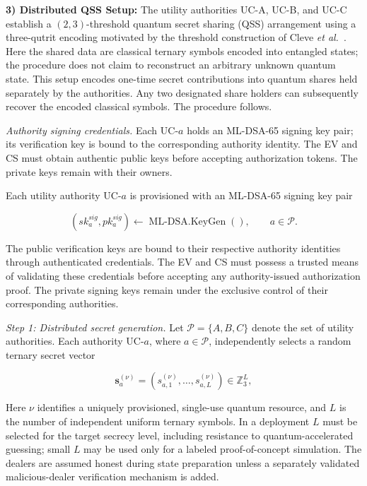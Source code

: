 \documentclass[twocolumn,10pt,journal]{IEEEtran}
\begin{document}
\noindent\textbf{3) Distributed QSS Setup:}
The utility authorities UC-A, UC-B, and UC-C establish
a $(2,3)$-threshold quantum secret sharing (QSS)
arrangement using a three-qutrit encoding motivated by the
threshold construction of Cleve \emph{et al.}~\cite{cleve1999quantum}.
Here the shared data are classical ternary symbols encoded into
entangled states; the procedure does not claim to reconstruct an
arbitrary unknown quantum state.
This setup encodes one-time secret contributions into
quantum shares held separately by the authorities. Any
two designated share holders can subsequently recover
the encoded classical symbols. The procedure follows.

\textit{Authority signing credentials.}
Each UC-$a$ holds an ML-DSA-65 signing key pair;
its verification key is bound to the corresponding authority identity.
The EV and CS must obtain authentic public keys before accepting
authorization tokens. The private keys remain with their owners.

Each utility authority UC-$a$ is provisioned
with an ML-DSA-65 signing key pair

\begin{equation}
(sk_a^{sig},pk_a^{sig})
\leftarrow
\operatorname{ML\mbox{-}DSA.KeyGen}(),
\qquad a\in\mathcal{P}.
\label{eq:qsv2g_authority_signing_keys}
\end{equation}

The public verification keys are bound to
their respective authority identities through
authenticated credentials. The EV and CS
must possess a trusted means of validating
these credentials before accepting any
authority-issued authorization proof.
The private signing keys remain under the
exclusive control of their corresponding
authorities.

\textit{Step 1: Distributed secret generation.}
Let $\mathcal{P}=\{A,B,C\}$ denote the set of utility
authorities. Each authority UC-$a$, where
$a\in\mathcal{P}$, independently selects a random
ternary secret vector

\begin{equation}
\mathbf{s}_{a}^{(\nu)}
=
(s_{a,1}^{(\nu)},\ldots,s_{a,L}^{(\nu)})
\in\mathbb{Z}_3^L,
\label{eq:qss_local_secret}
\end{equation}

Here $\nu$ identifies a uniquely provisioned, single-use quantum
resource, and $L$ is the number of independent uniform ternary symbols.
In a deployment $L$ must be selected for the target secrecy level,
including resistance to quantum-accelerated guessing; small $L$ may
be used only for a labeled proof-of-concept simulation. The dealers
are assumed honest during state preparation unless a separately
validated malicious-dealer verification mechanism is added.
\end{document}
